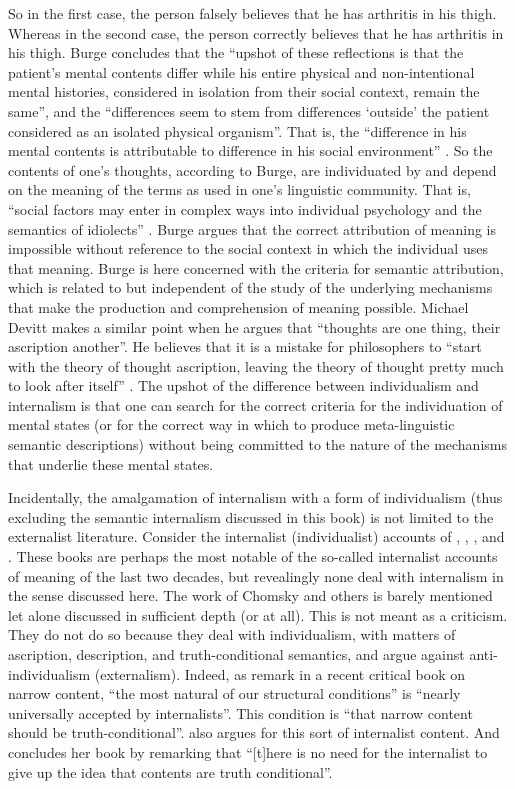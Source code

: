 So in the first case, the person falsely believes that he has arthritis in his thigh. Whereas in the second case, the person correctly believes that he has arthritis in his thigh. Burge concludes that the “upshot of these reflections is that the patient’s mental contents differ while his entire physical and non-intentional mental histories, considered in isolation from their social context, remain the same”, and the “differences seem to stem from differences ‘outside’ the patient considered as an isolated physical organism”. That is, the “difference in his mental contents is attributable to difference in his social environment” \citep[79]{Burge1979}. So the contents of one’s thoughts, according to Burge, are individuated by and depend on the meaning of the terms as used in one’s linguistic community. That is, “social factors may enter in complex ways into individual psychology and the semantics of idiolects” \citep[275]{Burge1989}. Burge argues that the correct attribution of meaning is impossible without reference to the social context in which the individual uses that meaning. Burge is here concerned with the criteria for semantic attribution, which is related to but independent of the study of the underlying mechanisms that make the production and comprehension of meaning possible. Michael Devitt makes a similar point when he argues that “thoughts are one thing, their ascription another”. He believes that it is a mistake for philosophers to “start with the theory of thought ascription, leaving the theory of thought pretty much to look after itself” \citep[385]{Devitt1984}. The upshot of the difference between individualism and internalism is that one can search for the correct criteria for the individuation of mental states (or for the correct way in which to produce meta-linguistic semantic descriptions) without being committed to the nature of the mechanisms that underlie these mental states.

Incidentally, the amalgamation of internalism with a form of individualism (thus excluding the semantic internalism discussed in this book) is not limited to the externalist literature. Consider the internalist (individualist) accounts of \citet{Segal2000}, \citet{Farkas2008}, \citet{Mendola2008}, and \citet{Georgalis2015}. These books are perhaps the most notable of the so-called internalist accounts of meaning of the last two decades, but revealingly none deal with internalism in the sense discussed here. The work of Chomsky and others is barely mentioned let alone discussed in sufficient depth (or at all). This is not meant as a criticism. They do not do so because they deal with individualism, with matters of ascription, description, and truth-conditional semantics, and argue against anti-individualism (externalism). Indeed, as \citet[63]{Yli-VakkuriHawthorne2018} remark in a recent critical book on narrow content, “the most natural of our structural conditions” is “nearly universally accepted by internalists”. This condition is “that narrow content should be truth-conditional”. \citet{Chalmers2003} also argues for this sort of internalist content. And \citet[184]{Farkas2008} concludes her book by remarking that “[t]here is no need for the internalist to give up the idea that contents are truth conditional”. 

